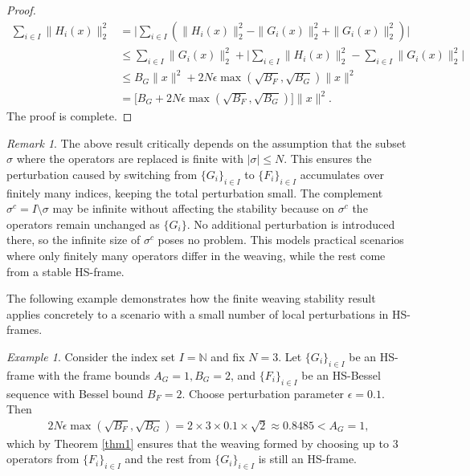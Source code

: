 \documentclass[reqno]{amsart}
\theoremstyle{plain}
\theoremstyle{remark}
\newtheorem{rem}[thm]{Remark}
\newtheorem{exa}[thm]{Example}
\numberwithin{equation}{section}
\begin{document}
\begin{proof}
\begin{align*}
\sum_{i \in I} \|H_i(x)\|_2^2 &=\Big|\sum_{i \in I}( \|H_i(x)\|_2^2 - \|G_i(x)\|_2^2 + \|G_i(x)\|_2^2) \Big|\\
&\leq \sum_{i \in I} \|G_i(x)\|_2^2+\Big| \sum_{i \in I} \|H_i(x)\|_2^2 - \sum_{i \in I} \|G_i(x)\|_2^2 \Big|\\
&\leq B_G \|x\|^2+2 N \epsilon \max(\sqrt{B_F}, \sqrt{B_G}) \|x\|^2\\
&=\big[B_G + 2 N \epsilon \max(\sqrt{B_F}, \sqrt{B_G}) \big] \|x\|^2.
\end{align*}
The proof is complete.
\end{proof}

\begin{rem}
The above result critically depends on the assumption that the subset $\sigma$ where the operators are replaced is finite with $|\sigma| \leq N$. This ensures the perturbation caused by switching from $\{G_i\}_{i \in I}$ to $\{F_i\}_{i \in I}$ accumulates over finitely many indices, keeping the total perturbation small. The complement $\sigma^c = I \setminus \sigma$ may be infinite without affecting the stability because on $\sigma^c$ the operators remain unchanged as $\{G_i\}$. No additional perturbation is introduced there, so the infinite size of $\sigma^c$ poses no problem.
This models practical scenarios where only finitely many operators differ in the weaving, while the rest come from a stable HS-frame.
\end{rem}

The following example demonstrates how the finite weaving stability result applies concretely to a scenario with a small number of local perturbations in HS-frames.
\begin{exa}
Consider the index set $I = \mathbb{N}$ and fix $N=3$. Let $\{G_i\}_{i \in I}$ be an HS-frame with the frame bounds $A_G = 1, B_G = 2$, and $\{F_i\}_{i \in I}$ be an HS-Bessel sequence with Bessel bound $B_F=2$. Choose perturbation parameter $\epsilon = 0.1$. Then
\begin{align*}
2 N \epsilon \max(\sqrt{B_F}, \sqrt{B_G})  = 2 \times 3 \times 0.1 \times \sqrt{2} \approx 0.8485 < A_G = 1,
\end{align*}
which by Theorem \ref{thm1} ensures that the weaving formed by choosing up to $3$ operators from $\{F_i\}_{i \in I}$ and the rest from $\{G_i\}_{i \in I}$ is still an HS-frame.
\end{exa}
\end{document}
